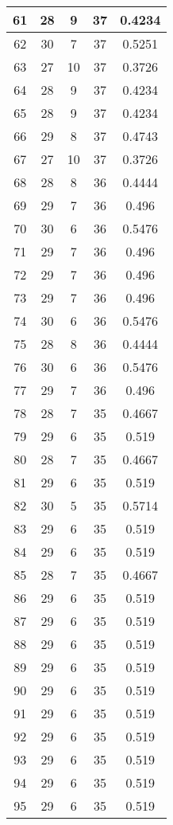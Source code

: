 \documentclass[letterpaper, 12pt]{article}
\begin{document}
\begin{longtable}{|c|c|c|c|c|}
61 & 28 & 9 & 37 & 0.4234 \\
\hline
62 & 30 & 7 & 37 & 0.5251 \\
\hline
63 & 27 & 10 & 37 & 0.3726 \\
\hline
64 & 28 & 9 & 37 & 0.4234 \\
\hline
65 & 28 & 9 & 37 & 0.4234 \\
\hline
66 & 29 & 8 & 37 & 0.4743 \\
\hline
67 & 27 & 10 & 37 & 0.3726 \\
\hline
68 & 28 & 8 & 36 & 0.4444 \\
\hline
69 & 29 & 7 & 36 & 0.496 \\
\hline
70 & 30 & 6 & 36 & 0.5476 \\
\hline
71 & 29 & 7 & 36 & 0.496 \\
\hline
72 & 29 & 7 & 36 & 0.496 \\
\hline
73 & 29 & 7 & 36 & 0.496 \\
\hline
74 & 30 & 6 & 36 & 0.5476 \\
\hline
75 & 28 & 8 & 36 & 0.4444 \\
\hline
76 & 30 & 6 & 36 & 0.5476 \\
\hline
77 & 29 & 7 & 36 & 0.496 \\
\hline
78 & 28 & 7 & 35 & 0.4667 \\
\hline
79 & 29 & 6 & 35 & 0.519 \\
\hline
80 & 28 & 7 & 35 & 0.4667 \\
\hline
81 & 29 & 6 & 35 & 0.519 \\
\hline
82 & 30 & 5 & 35 & 0.5714 \\
\hline
83 & 29 & 6 & 35 & 0.519 \\
\hline
84 & 29 & 6 & 35 & 0.519 \\
\hline
85 & 28 & 7 & 35 & 0.4667 \\
\hline
86 & 29 & 6 & 35 & 0.519 \\
\hline
87 & 29 & 6 & 35 & 0.519 \\
\hline
88 & 29 & 6 & 35 & 0.519 \\
\hline
89 & 29 & 6 & 35 & 0.519 \\
\hline
90 & 29 & 6 & 35 & 0.519 \\
\hline
91 & 29 & 6 & 35 & 0.519 \\
\hline
92 & 29 & 6 & 35 & 0.519 \\
\hline
93 & 29 & 6 & 35 & 0.519 \\
\hline
94 & 29 & 6 & 35 & 0.519 \\
\hline
95 & 29 & 6 & 35 & 0.519 \\

\end{longtable}
\end{document}
